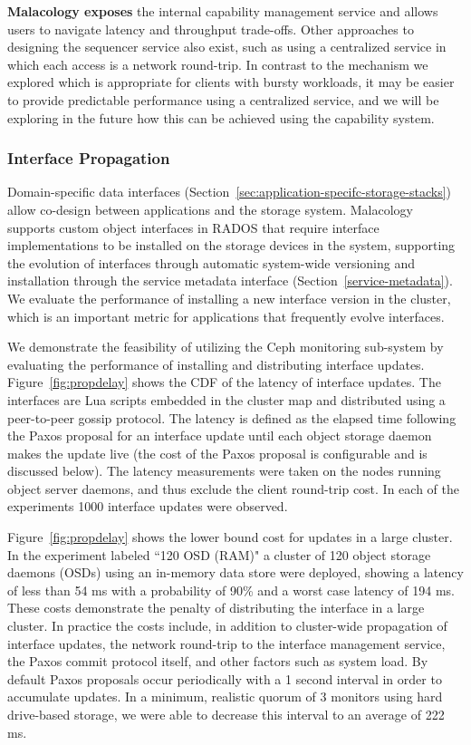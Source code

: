 \textbf{Malacology exposes} the internal capability management service and
allows users to navigate latency and throughput trade-offs.  Other approaches
to designing the sequencer service also exist, such as using a centralized
service in which each access is a network round-trip. In contrast to the
mechanism we explored which is appropriate for clients with bursty workloads,
it may be easier to provide predictable performance using a centralized
service, and we will be exploring in the future how this can be achieved using
the capability system.

\subsubsection{Interface Propagation}

Domain-specific data interfaces
(Section~\ref{sec:application-specifc-storage-stacks}) allow co-design between
applications and the storage system. Malacology supports custom object
interfaces in RADOS that require interface implementations to be installed on
the storage devices in the system, supporting the evolution of interfaces
through automatic system-wide versioning and installation through the service
metadata interface (Section~\ref{service-metadata}). We evaluate the
performance of installing a new interface version in the cluster, which is an
important metric for applications that frequently evolve interfaces.

We demonstrate the feasibility of utilizing the Ceph monitoring sub-system by
evaluating the performance of installing and distributing interface updates.
Figure~\ref{fig:propdelay} shows the CDF of the latency of interface updates.
The interfaces are Lua scripts embedded in the cluster map and distributed
using a peer-to-peer gossip protocol.  The latency is defined as the elapsed
time following the Paxos proposal for an interface update until each object storage daemon makes
the update live (the cost of the Paxos proposal is configurable and is
discussed below). The latency measurements were taken on the nodes running object
server daemons, and thus exclude the client round-trip cost. In each of the
experiments 1000 interface updates were observed.

Figure~\ref{fig:propdelay} shows the lower bound cost for updates in a large
cluster. In the experiment labeled ``120 OSD (RAM)" a cluster of 120 object storage daemons (OSDs)
using an in-memory data store were deployed, showing a
latency of less than 54 ms with a probability of 90\% and a worst case latency
of 194 ms. These costs demonstrate the penalty of distributing the interface in
a large cluster. In practice the costs include, in addition to cluster-wide
propagation of interface updates, the network round-trip to the interface
management service, the Paxos commit protocol itself, and other factors such as
system load. By default Paxos proposals occur periodically with a 1 second
interval in order to accumulate updates. In a minimum, realistic quorum of 3
monitors using hard drive-based storage, we were able to decrease this interval to an
average of 222 ms.

